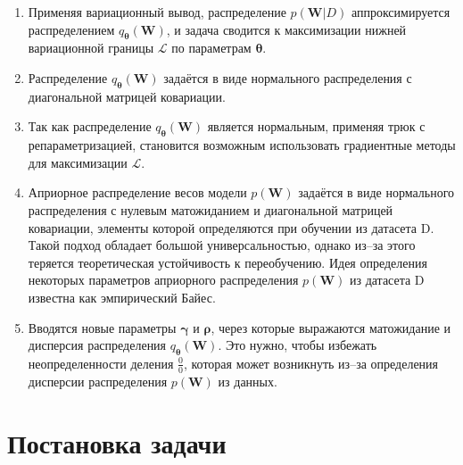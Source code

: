 \documentclass{article}
\begin{document}
    \begin{enumerate}
        \item Применяя вариационный вывод, распределение $p(\pmb{W}| D)$
            аппроксимируется распределением $q_{\pmb{\theta}}(\pmb{W})$,
            и задача сводится к максимизации нижней вариационной границы
            $\mathcal{L}$ по параметрам $\pmb{\theta}$.
        \item Распределение $q_{\pmb{\theta}}(\pmb{W})$
            задаётся в виде нормального распределения с диагональной матрицей ковариации.
        \item Так как распределение $q_{\pmb{\theta}}(\pmb{W})$
            является нормальным, применяя трюк с репараметризацией,
            становится возможным использовать градиентные методы
            для максимизации $\mathcal{L}$.
        \item Априорное распределение весов модели $p(\pmb{W})$
            задаётся в виде нормального распределения с нулевым матожиданием
            и диагональной матрицей ковариации, элементы которой определяются при обучении из датасета D.
            Такой подход обладает большой универсальностью,
            однако из--за этого теряется теоретическая устойчивость к переобучению.
            Идея определения некоторых параметров априорного распределения
            $p(\pmb{W})$ из датасета D
            известна как эмпирический Байес.
        \item Вводятся новые параметры $\pmb{\gamma}$ и $\pmb{\rho}$,
            через которые выражаются матожидание и дисперсия распределения
            $q_{\pmb{\theta}}(\pmb{W})$.
            Это нужно, чтобы избежать неопределенности деления $\frac{0}{0}$,
            которая может возникнуть из--за определения дисперсии распределения $p(\pmb{W})$ из данных.
    \end{enumerate}

    \section{Постановка задачи}
\end{document}
